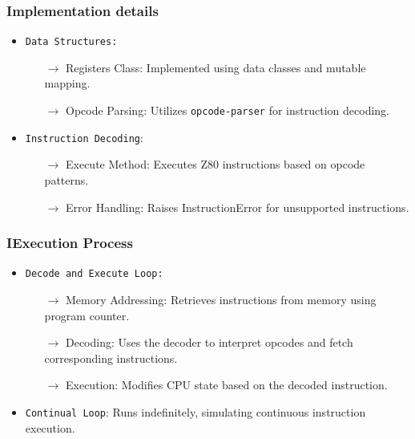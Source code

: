 \documentclass{beamer}
\newcommand{\arrow}{\(\rightarrow\)}
\begin{document}
\begin{frame}[fragile]
\frametitle{Implementation details}
\begin{itemize}
\item<1-> \texttt{Data Structures:}
\begin{itemize}
\item[\arrow] Registers Class: Implemented using data classes and mutable mapping.

\item[\arrow]  Opcode Parsing: Utilizes \texttt{opcode-parser} for instruction decoding.

\end{itemize}

\item<2->\texttt{Instruction Decoding}:
\begin{itemize}
\item[\arrow] Execute Method: Executes Z80 instructions based on opcode patterns.
\item[\arrow]  Error Handling: Raises InstructionError for unsupported instructions.

\end{itemize}
\end{itemize}
\end{frame}


\begin{frame}[fragile]
\frametitle{IExecution Process}
\begin{itemize}
\item<1-> \texttt{Decode and Execute Loop:}
\begin{itemize}

\item[\arrow] Memory Addressing: Retrieves instructions from memory using program counter.

\item[\arrow]  Decoding: Uses the decoder to interpret opcodes and fetch corresponding instructions.

\item[\arrow]  Execution: Modifies CPU state based on the decoded instruction.

\end{itemize}

\item<2->\texttt{Continual Loop}: Runs indefinitely, simulating continuous instruction execution.
\end{itemize}
\end{frame}
\end{document}
